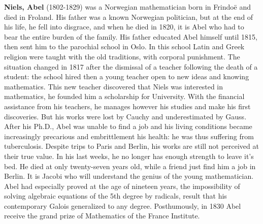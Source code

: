 \textbf{Niels, Abel} (1802-1829) was a Norwegian mathematician born in Frindoë and died in Froland. His father was a known Norwegian politician, but at the end of his life, he fell into disgrace, and when he died in 1820, it is Abel who had to bear the entire burden of the family. His father educated Abel himself until 1815, then sent him to the parochial school in Oslo. In this school Latin and Greek religion were taught with the old traditions, with corporal punishment. The situation changed in 1817 after the dismissal of a teacher following the death of a student: the school hired then a young teacher open to new ideas and knowing mathematics. This new teacher discovered that Niels was interested in mathematics, he founded him a scholarship for University. With the financial assistance from his teachers, he manages however his studies and make his first discoveries. But his works were lost by Cauchy and underestimated by Gauss. After his Ph.D., Abel was unable to find a job and his living conditions became increasingly precarious and embrittlement his health: he was thus suffering from tuberculosis. Despite trips to Paris and Berlin, his works are still not perceived at their true value. In his last weeks, he no longer has enough strength to leave it's bed. He died at only twenty-seven years old, while a friend just find him a job in Berlin. It is Jacobi who will understand the genius of the young mathematician. Abel had especially proved at the age of nineteen years, the impossibility of solving algebraic equations of the 5th degree by radicals, result that his contemporary Galois generalized to any degree. Posthumously, in 1830 Abel receive the grand prize of Mathematics of the France Institute.

